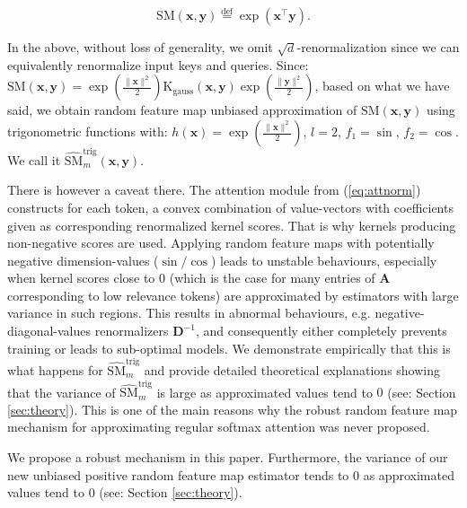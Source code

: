 \begin{equation}
\mathrm{SM}(\mathbf{x}, \mathbf{y}) \overset{\mathrm{def}}{=} \exp(\mathbf{x}^{\top}\mathbf{y}).    
\end{equation}

In the above, without loss of generality, we omit $\sqrt{d}$-renormalization since we can equivalently renormalize input keys and queries. Since: $\mathrm{SM}(\mathbf{x}, \mathbf{y}) = \exp(\frac{\|\mathbf{x}\|^{2}}{2})\mathrm{K}_{\mathrm{gauss}}(\mathbf{x},\mathbf{y})\exp(\frac{\|\mathbf{y}\|^{2}}{2})$, based on what we have said, we obtain random feature map unbiased approximation of $\mathrm{SM}(\mathbf{x}, \mathbf{y})$ using trigonometric functions with: $h(\mathbf{x})=\exp(\frac{\|\mathbf{x}\|^{2}}{2})$, $l=2$, $f_{1}=\sin$, $f_{2}=\cos$. We call it $\widehat{\mathrm{SM}}_{m}^{\mathrm{trig}}(\mathbf{x}, \mathbf{y})$. 

There is however a caveat there. The attention module from (\ref{eq:attnorm}) constructs for each token, a convex combination of value-vectors with coefficients given as corresponding renormalized kernel scores. That is why kernels producing non-negative scores are used. Applying random feature maps with potentially negative dimension-values ($\sin/\cos$) leads to unstable behaviours, especially when kernel scores close to $0$ (which is the case for many entries of $\mathbf{A}$ corresponding to low relevance tokens) are approximated by estimators with large variance in such regions. This results in abnormal behaviours, e.g. negative-diagonal-values renormalizers $\mathbf{D}^{-1}$, and consequently either completely prevents training or leads to sub-optimal models. We demonstrate empirically that this is what happens for $\widehat{\mathrm{SM}}_{m}^{\mathrm{trig}}$ and provide detailed theoretical explanations showing that the variance of $\widehat{\mathrm{SM}}_{m}^{\mathrm{trig}}$ is large as approximated values tend to $0$ (see: Section \ref{sec:theory}). This is one of the main reasons why the robust random feature map mechanism for approximating regular softmax attention was never proposed.

We propose a robust mechanism in this paper. Furthermore, the variance of our new unbiased positive random feature map estimator tends to $0$ as approximated values tend to $0$ (see: Section \ref{sec:theory}).

